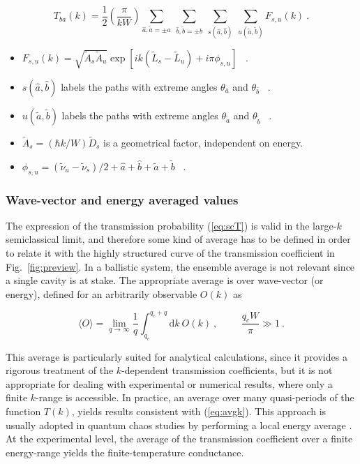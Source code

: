 \documentclass[a4paper,10pt]{article}
\newcommand{\dif}{\mathrm{d}}
\newcommand{\nin}{\noindent}
\newcommand{\be}{\begin{equation}}
\newcommand{\ee}{\end{equation}}
\begin{document}
\be
T_{ba}(k) = \frac{1}{2} \left(\frac{\pi}{kW}\right) 
\sum_{{\hat a},{\tilde a}=\pm a} \ 
\sum_{{\hat b},{\tilde b}=\pm b} \ \sum_{s({\hat a},{\hat b})} \ \sum_{u({\tilde a},{\tilde b})} 
F_{s,u}(k) \ .
\label{eq:scT}
\ee

\begin{itemize}

\item $F_{s,u}(k) = \sqrt{\tilde{A}_{s} \tilde{A}_{u}}
\exp{[i k (\tilde{L}_{s}-\tilde{L}_{u})+i \pi \phi_{s,u} ]}$ \ .
 
\item $s({\hat a},{\hat b})$ labels the paths with extreme angles $\theta_{\bar a}$ and ${\theta_{\bar b}}$ \ .

\item $u({\tilde a},{\tilde b})$ labels the paths with extreme angles $\theta_{\tilde a}$ and ${\theta_{\tilde b}}$ \ .

\item $\tilde{A}_{s}=(\hbar k/W) \tilde{D}_{s}$ is a geometrical factor, independent on energy.
  
\item $\phi_{s,u}=(\tilde{\nu}_{u}-\tilde{\nu}_{s})/2+\hat{a}+\hat{b}+
{\tilde a}+{\tilde b}$ \ .

\end{itemize}

\subsubsection{Wave-vector and energy averaged values}

The expression of the transmission probability (\ref{eq:scT}) is valid in the large-$k$ semiclassical limit, and therefore some kind of average has to be defined in order to relate it with the highly structured curve of the transmission coefficient in Fig.~\ref{fig:preview}. In a ballistic system, the ensemble average is not relevant since a single cavity is at stake. The appropriate average is over wave-vector (or energy), defined for an arbitrarily observable
$O(k)$ as

\be
\langle O \rangle =
\lim_{q \rightarrow \infty} \frac{1}{q} \int_{q_c}^{q_c+q} \dif k \ O (k) \ ,
\hspace{1cm}  \frac{q_c W}{\pi} \gg 1 \ .
\label{eq:avgk}
\ee

\nin This average is particularly suited for analytical calculations, since it provides a rigorous treatment of the $k$-dependent transmission coefficients, but it is not appropriate for dealing with experimental or numerical results, where only a finite $k$-range is accessible. In practice, an average over many quasi-periods of the function $T(k)$, yields   results consistent with (\ref{eq:avgk}). This approach is usually adopted in quantum chaos studies by performing a local energy average \cite{Blu88}.  At the experimental level, the average of the transmission coefficient over a finite energy-range yields the finite-temperature conductance.
\end{document}
